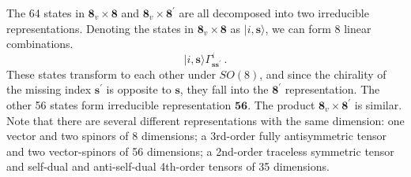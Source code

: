 	The 64 states in $\mathbf{8}_{v} \times \mathbf{8}$ and $\mathbf{8}_{v} \times \mathbf{8}^{\prime}$ are all decomposed into two irreducible representations. Denoting the states in $\mathbf{8}_{v} \times \mathbf{8}$ as $\lvert i, \mathbf{s}\rangle$, we can form 8 linear combinations.
	\begin{equation}
		\lvert i,\mathbf{s}\rangle \Gamma_{\mathbf{s}\mathbf{s}^{\prime}}^{i} \: . \label{10.5.19}
	\end{equation}
	These states transform to each other under $SO(8)$, and since the chirality of the missing index $\mathbf{s}^{\prime}$ is opposite to $\mathbf{s}$, they fall into the $\mathbf{8}^{\prime}$ representation. The other 56 states form irreducible representation $\mathbf{56}$. The product $\mathbf{8}_{v} \times \mathbf{8}^{\prime}$ is similar. Note that there are several different representations with the same dimension: one vector and two spinors of 8 dimensions; a 3rd-order fully antisymmetric tensor and two vector-spinors of 56 dimensions; a 2nd-order traceless symmetric tensor and self-dual and anti-self-dual 4th-order tensors of 35 dimensions.
